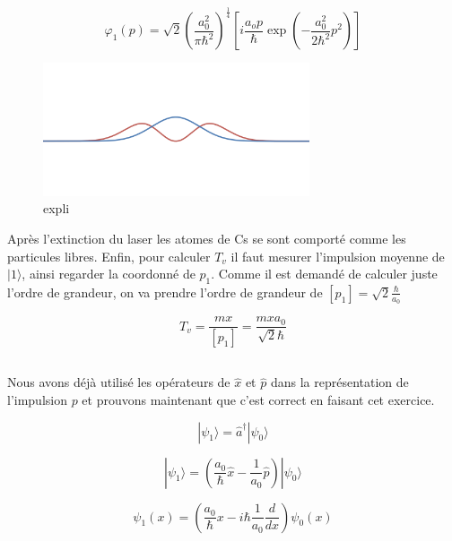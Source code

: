 \documentclass[a4paper,12pt]{article}
\begin{document}
\begin{equation}
	  \varphi_1(p) = \sqrt 2\left(\frac{a_0^2}{\pi \hbar^2}\right)^{\frac14}\left[i\frac{a_op}{\hbar}\exp\left(-\frac{a_0^2}{2\hbar^2}p^2\right)\right] 
\end{equation}

\begin{figure}
	\centering
	\includegraphics[width=0.7\textwidth]{1}
	\caption{expli}
	\label{fig:image}
\end{figure}

Après l'extinction du laser les atomes de Cs se sont comporté comme les particules libres. 
Enfin, pour calculer $T_v$ il faut mesurer l'impulsion moyenne de $|1\rangle$, ainsi regarder la coordonné de $p_1$. Comme il est demandé de calculer juste l'ordre de grandeur, on va prendre l'ordre de grandeur de $[p_1] = \sqrt 2\frac{\hbar}{a_0}$

\begin{equation}
	T_v = \frac{mx}{[p_1]}  = \frac{mxa_0}{\sqrt 2\hbar}
\end{equation}

\subsection{}
Nous avons déjà utilisé les opérateurs de $\hat x$ et $\hat p$ dans la représentation de l'impulsion $p$ et prouvons maintenant que c'est correct en faisant cet exercice.

\begin{equation}
	|\psi_1\rangle = \hat a^\dagger|\psi_0\rangle  
\end{equation}

\begin{equation}
	|\psi_1\rangle = \left( \frac{a_0}{\hbar}\hat x - \frac{1} {a_0}\hat p\right)|\psi_0\rangle 
\end{equation}


\begin{equation}
		\psi_1(x){=} \left( \frac{a_0}{\hbar}x -i\hbar \frac{1} {a_0}\frac{d}{dx} \right)\psi_0(x) 
\end{equation}
\end{document}
